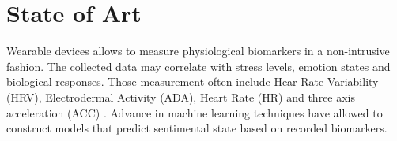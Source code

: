 \section{State of Art}


Wearable devices allows to measure physiological biomarkers in a non-intrusive fashion. The collected data may correlate with stress levels, emotion states and biological responses. Those measurement often include Hear Rate Variability (HRV), Electrodermal Activity (ADA), Heart Rate (HR) and three axis acceleration (ACC) \cite{Vos2023}. Advance in machine learning techniques have allowed to construct models that predict sentimental state based on recorded biomarkers.

